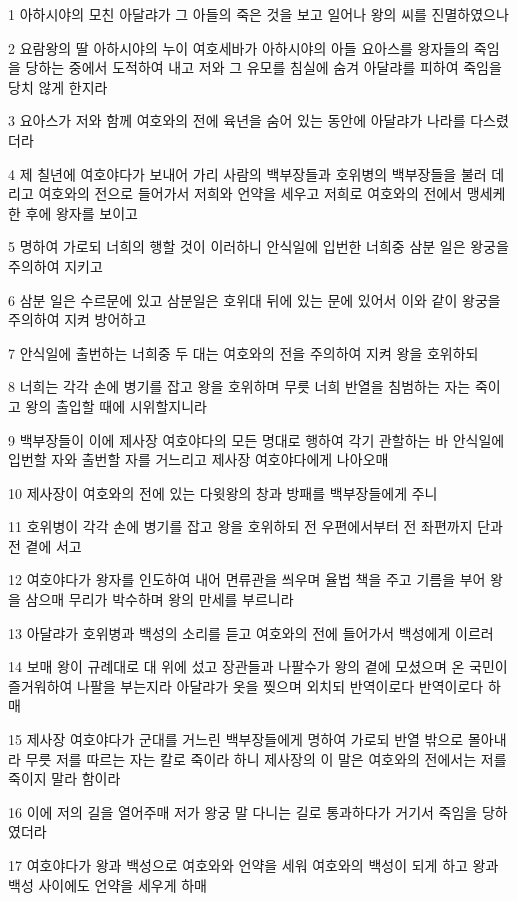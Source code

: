 \par 1 아하시야의 모친 아달랴가 그 아들의 죽은 것을 보고 일어나 왕의 씨를 진멸하였으나
\par 2 요람왕의 딸 아하시야의 누이 여호세바가 아하시야의 아들 요아스를 왕자들의 죽임을 당하는 중에서 도적하여 내고 저와 그 유모를 침실에 숨겨 아달랴를 피하여 죽임을 당치 않게 한지라
\par 3 요아스가 저와 함께 여호와의 전에 육년을 숨어 있는 동안에 아달랴가 나라를 다스렸더라
\par 4 제 칠년에 여호야다가 보내어 가리 사람의 백부장들과 호위병의 백부장들을 불러 데리고 여호와의 전으로 들어가서 저희와 언약을 세우고 저희로 여호와의 전에서 맹세케 한 후에 왕자를 보이고
\par 5 명하여 가로되 너희의 행할 것이 이러하니 안식일에 입번한 너희중 삼분 일은 왕궁을 주의하여 지키고
\par 6 삼분 일은 수르문에 있고 삼분일은 호위대 뒤에 있는 문에 있어서 이와 같이 왕궁을 주의하여 지켜 방어하고
\par 7 안식일에 출번하는 너희중 두 대는 여호와의 전을 주의하여 지켜 왕을 호위하되
\par 8 너희는 각각 손에 병기를 잡고 왕을 호위하며 무릇 너희 반열을 침범하는 자는 죽이고 왕의 출입할 때에 시위할지니라
\par 9 백부장들이 이에 제사장 여호야다의 모든 명대로 행하여 각기 관할하는 바 안식일에 입번할 자와 출번할 자를 거느리고 제사장 여호야다에게 나아오매
\par 10 제사장이 여호와의 전에 있는 다윗왕의 창과 방패를 백부장들에게 주니
\par 11 호위병이 각각 손에 병기를 잡고 왕을 호위하되 전 우편에서부터 전 좌편까지 단과 전 곁에 서고
\par 12 여호야다가 왕자를 인도하여 내어 면류관을 씌우며 율법 책을 주고 기름을 부어 왕을 삼으매 무리가 박수하며 왕의 만세를 부르니라
\par 13 아달랴가 호위병과 백성의 소리를 듣고 여호와의 전에 들어가서 백성에게 이르러
\par 14 보매 왕이 규례대로 대 위에 섰고 장관들과 나팔수가 왕의 곁에 모셨으며 온 국민이 즐거워하여 나팔을 부는지라 아달랴가 옷을 찢으며 외치되 반역이로다 반역이로다 하매
\par 15 제사장 여호야다가 군대를 거느린 백부장들에게 명하여 가로되 반열 밖으로 몰아내라 무릇 저를 따르는 자는 칼로 죽이라 하니 제사장의 이 말은 여호와의 전에서는 저를 죽이지 말라 함이라
\par 16 이에 저의 길을 열어주매 저가 왕궁 말 다니는 길로 통과하다가 거기서 죽임을 당하였더라
\par 17 여호야다가 왕과 백성으로 여호와와 언약을 세워 여호와의 백성이 되게 하고 왕과 백성 사이에도 언약을 세우게 하매
